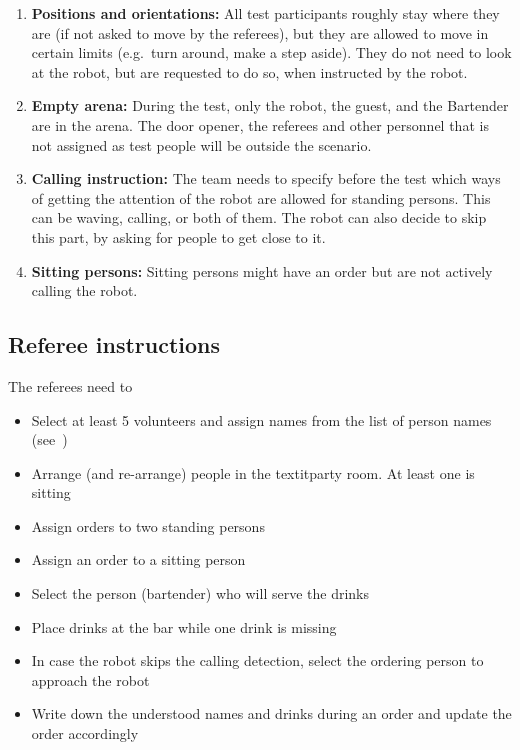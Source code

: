 \begin{enumerate}
	\item \textbf{Positions and orientations:} All test participants roughly stay where they are (if not asked to move by the referees), but they are allowed to move in certain limits (e.g.~turn around, make a step aside). They do not need to look at the robot, but are requested to do so, when instructed by the robot.

	\item \textbf{Empty arena:} During the test, only the robot, the guest, and the Bartender are in the arena. The door opener, the referees and other personnel that is not assigned as test people will be outside the scenario.

	\item \textbf{Calling instruction:} The team needs to specify before the test which ways of getting the attention of the robot are allowed for standing persons. This can be waving, calling, or both of them. The robot can also decide to skip this part, by asking for people to get close to it.

	\item \textbf{Sitting persons:} Sitting persons might have an order but are not actively calling the robot.
\end{enumerate}

\subsection{Referee instructions}

The referees need to
\begin{itemize}
	\item Select at least 5 volunteers and assign names from the list of person names (see~)
	\item Arrange (and re-arrange) people in the textit{party room}. At least one is sitting
	\item Assign orders to two standing persons
	\item Assign an order to a sitting person
	\item Select the person (bartender) who will serve the drinks
	\item Place drinks at the bar while one drink is missing
	\item In case the robot skips the calling detection, select the ordering person to approach the robot
	\item Write down the understood names and drinks during an order and update the order accordingly
\end{itemize}

